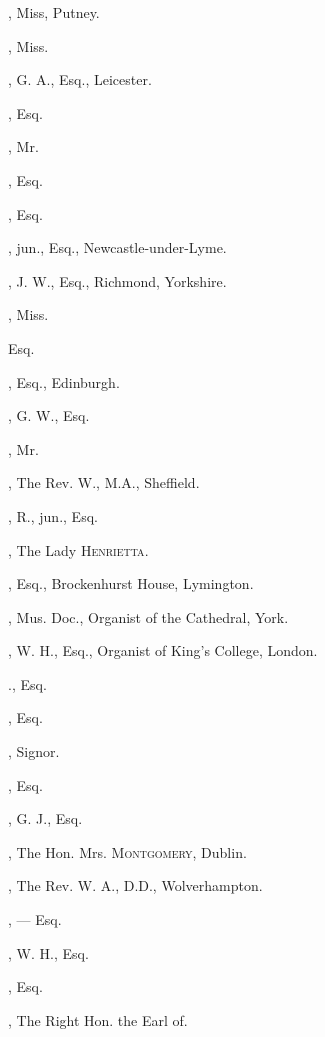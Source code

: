 \begin{multicols}{2}
, Miss, Putney.

, Miss.

, G. A., Esq., Leicester.

, Esq.

, Mr.

, Esq.
\bigskip

, Esq.

, jun., Esq., Newcastle-under-Lyme.

, J. W., Esq., Richmond, Yorkshire.

, Miss.

 Esq.

, Esq., Edinburgh.

, G. W., Esq.

, Mr.

, The Rev. W., M.A., Sheffield.

, R., jun., Esq.

, The Lady \textsc{Henrietta}.

, Esq., Brockenhurst House,
Lymington.

, Mus. Doc., Organist
of the Cathedral, York.

, W. H., Esq., Organist of King’s
College, London.

., Esq.

, Esq.

, Signor.

, Esq.

, G. J., Esq.

, The Hon. Mrs. \textsc{Montgomery},
Dublin.
\columnbreak

, The Rev. W. A., D.D., Wolverhampton.

, — Esq.

, W. H., Esq.

, Esq.

, The Right Hon. the Earl of.


\end{multicols}
